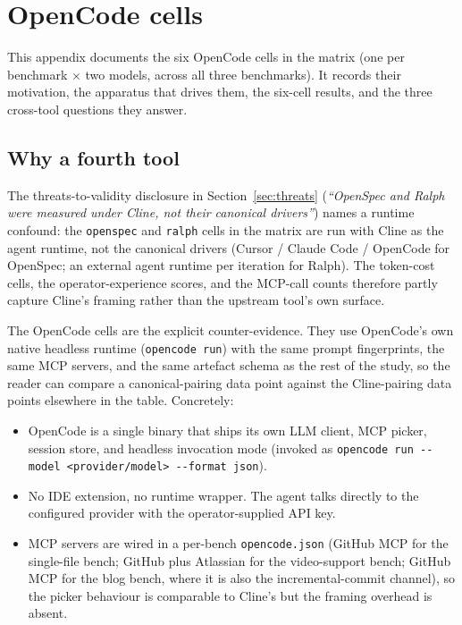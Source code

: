 \section{OpenCode cells}\label{app:opencode-bench}

\sloppy

This appendix documents the six OpenCode cells in the matrix
(one per benchmark $\times$ two models, across all three benchmarks).
It records their motivation, the apparatus that drives them, the
six-cell results, and the three cross-tool questions they answer.

\subsection{Why a fourth tool}

The threats-to-validity disclosure in
Section~\ref{sec:threats} (\emph{``OpenSpec and Ralph were measured under
Cline, not their canonical drivers''}) names a runtime confound: the
\texttt{openspec} and \texttt{ralph} cells in the matrix are run
with Cline as the agent runtime, not the canonical drivers
(Cursor / Claude Code / OpenCode for OpenSpec; an external
agent runtime per iteration for Ralph). The token-cost cells, the
operator-experience scores, and the MCP-call counts therefore partly
capture Cline's framing rather than the upstream tool's own surface.

The OpenCode cells are the explicit counter-evidence. They
use OpenCode's own native headless runtime
(\texttt{opencode run}) with the same prompt fingerprints, the same
MCP servers, and the same artefact schema as the rest of the study,
so the reader can compare a canonical-pairing data point against the
Cline-pairing data points elsewhere in the table. Concretely:

\begin{itemize}
\item OpenCode is a single binary that ships its own LLM
  client, MCP picker, session store, and headless invocation mode
  (invoked as \texttt{opencode run -{}-model <provider/model>
  -{}-format json}).
\item No IDE extension, no runtime wrapper. The agent talks directly
  to the configured provider with the operator-supplied API key.
\item MCP servers are wired in a per-bench \texttt{opencode.json}
  (GitHub MCP for the single-file bench; GitHub plus Atlassian for the
  video-support bench; GitHub MCP for the blog bench, where it
  is also the incremental-commit channel), so the picker behaviour is
  comparable to Cline's but the framing overhead is absent.
\end{itemize}

